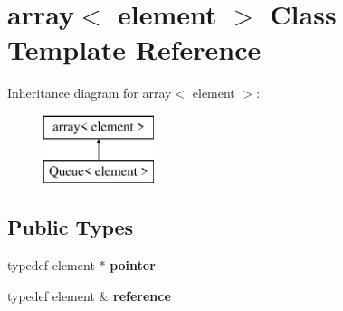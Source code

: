 \hypertarget{classarray}{\section{array$<$ element $>$ Class Template Reference}
\label{classarray}
}
Inheritance diagram for array$<$ element $>$\+:\begin{figure}[H]
\begin{center}
\leavevmode
\includegraphics[height=2.000000cm]{classarray}
\end{center}
\end{figure}
\subsection*{Public Types}
\begin{DoxyCompactItemize}
\item 
\hypertarget{classarray_ae135cc14d9929a90d327c78c23ad07a9}{typedef element $\ast$ {\bfseries pointer}}\label{classarray_ae135cc14d9929a90d327c78c23ad07a9}

\item 
\hypertarget{classarray_a307f3110e92eaa6b7fe3c31c87366778}{typedef element \& {\bfseries reference}}\label{classarray_a307f3110e92eaa6b7fe3c31c87366778}

\end{DoxyCompactItemize}

